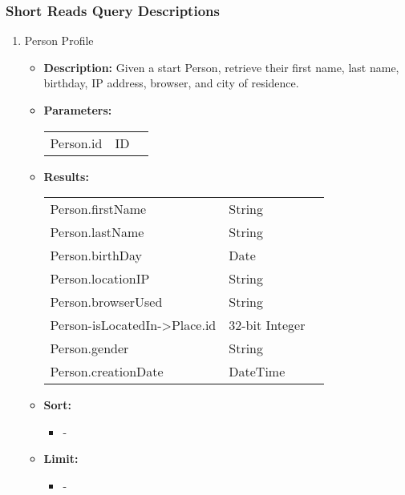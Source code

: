 \subsubsection{Short Reads Query Descriptions}

{\small
\begin{enumerate}

  \item Person Profile
    \begin{itemize}
      \item \textbf{Description:}
        Given a start Person, retrieve their first name, last name, birthday, IP address, browser, and city of residence.
      \item \textbf{Parameters:} \\
        \begin{tabular}{lll}
          Person.id 										& ID \\
        \end{tabular}
      \item \textbf{Results:} \\
        \begin{tabular}{lll}
          Person.firstName									& String \\
          Person.lastName										& String \\
          Person.birthDay										& Date \\
          Person.locationIP									& String \\
          Person.browserUsed								& String \\
          Person-isLocatedIn->Place.id			& 32-bit Integer \\
          Person.gender									    & String \\
          Person.creationDate						    & DateTime \\
        \end{tabular}
            \item \textbf{Sort:}
                  \begin{itemize}
                    \item[] -
                  \end{itemize}
            \item \textbf{Limit:}
                  \begin{itemize}
                    \item[] -
                  \end{itemize}
    \end{itemize}


\end{enumerate}}
